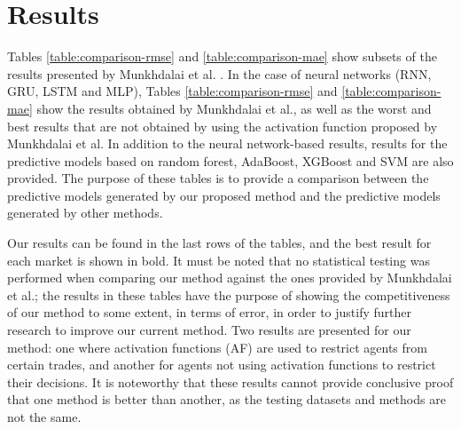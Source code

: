 \documentclass{ieeeaccess}
\begin{document}
\section{Results}
\label{section:results}

Tables \ref{table:comparison-rmse} and \ref{table:comparison-mae} show
subsets of the results presented by Munkhdalai et
al. \cite{Munkhdalai2019}. In the case of neural networks (RNN, GRU,
LSTM and MLP), Tables \ref{table:comparison-rmse} and
\ref{table:comparison-mae} show the results obtained by Munkhdalai et
al., as well as the worst and best results that are not obtained by
using the activation function proposed by Munkhdalai et al. In
addition to the neural network-based results, results for the
predictive models based on random forest, AdaBoost, XGBoost and
SVM are also provided. The purpose of these tables
is to provide a comparison between the predictive models generated by
our proposed method and the predictive models generated by other
methods.

Our results can be found in the last rows of the tables, and the best
result for each market is shown in bold. It must be noted that no
statistical testing was performed when comparing our method against
the ones provided by Munkhdalai et al.; the results in these tables
have the purpose of showing the competitiveness of our method to some
extent, in terms of error, in order to justify further research to
improve our current method. %
Two results are presented for
our method: one where activation functions (AF) are used to restrict agents
from certain trades, and another for agents not using activation
functions to restrict their decisions. It is noteworthy that these
results cannot provide conclusive proof that one method is better than
another, as the testing datasets and methods are not the
same. %

\end{document}
